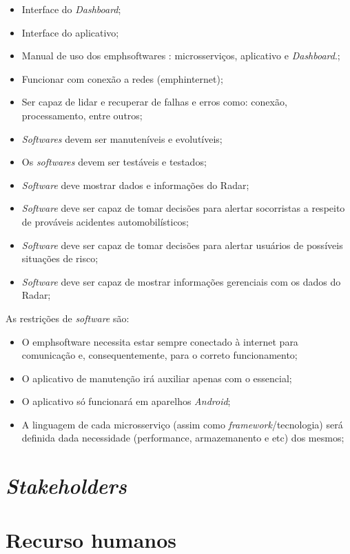 \begin{itemize}
    \item Interface do \emph{Dashboard};
    \item Interface do aplicativo;
    \item Manual de uso dos emph{softwares} : microsserviços, aplicativo e \emph{Dashboard}.;
    \item Funcionar com conexão a redes (emph{internet});
    \item Ser capaz de lidar e recuperar de falhas e erros como: conexão, processamento, entre outros;
    \item \emph{Softwares} devem ser manuteníveis e evolutíveis;
    \item Os \emph{softwares} devem ser testáveis e testados;
    \item \emph{Software} deve mostrar dados e informações do Radar;
    \item \emph{Software} deve ser capaz de tomar decisões para alertar socorristas a respeito de prováveis acidentes automobilísticos;
    \item \emph{Software} deve ser capaz de tomar decisões para alertar usuários de possíveis situações de risco;
    \item \emph{Software} deve ser capaz de mostrar informações gerenciais com os dados do Radar;
\end{itemize}

As restrições de \emph{software} são:

\begin{itemize}
    \item O emph{software} necessita estar sempre conectado à internet para comunicação e, consequentemente, para o correto funcionamento;
    \item O aplicativo de manutenção irá auxiliar apenas com o essencial;
    \item O aplicativo só funcionará em aparelhos \emph{Android};
    \item A linguagem de cada microsserviço (assim como \emph{framework}/tecnologia) será definida dada necessidade (performance, armazemanento e etc) dos mesmos;
\end{itemize}

\section{\emph{Stakeholders}}
\section{Recurso humanos}

